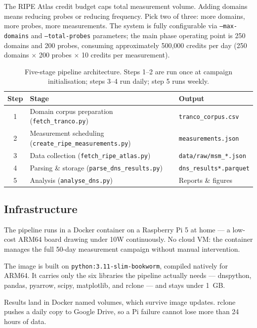 The RIPE Atlas credit budget caps total measurement volume. Adding domains means reducing probes or reducing frequency. Pick two of three: more domains, more probes, more measurements. The system is fully configurable via \texttt{--max-domains} and \texttt{--total-probes} parameters; the main phase operating point is 250 domains and 200 probes, consuming approximately 500,000 credits per day (250 domains $\times$ 200 probes $\times$ 10 credits per measurement).

\begin{table}[H]
\centering
\small
\begin{tabular}{c l l}
\toprule
\textbf{Step} & \textbf{Stage} & \textbf{Output} \\
\midrule
1 & Domain corpus preparation (\texttt{fetch\_tranco.py})         & \texttt{tranco\_corpus.csv} \\
2 & Measurement scheduling (\texttt{create\_ripe\_measurements.py}) & \texttt{measurements.json} \\
3 & Data collection (\texttt{fetch\_ripe\_atlas.py})               & \texttt{data/raw/msm\_*.json} \\
4 & Parsing \& storage (\texttt{parse\_dns\_results.py})           & \texttt{dns\_results*.parquet} \\
5 & Analysis (\texttt{analyse\_dns.py})                            & Reports \& figures \\
\bottomrule
\end{tabular}
\caption{Five-stage pipeline architecture. Steps 1--2 are run once at campaign initialisation; steps 3--4 run daily; step 5 runs weekly.}
\label{tab:pipeline_stages}
\end{table}

\subsection{Infrastructure}
\label{subsec:3.1.3}

The pipeline runs in a Docker container on a Raspberry Pi 5 at home --- a low-cost ARM64 board drawing under 10W continuously. No cloud VM: the container manages the full 50-day measurement campaign without manual intervention.

The image is built on \texttt{python:3.11-slim-bookworm}, compiled natively for ARM64. It carries only the six libraries the pipeline actually needs --- dnspython, pandas, pyarrow, scipy, matplotlib, and rclone --- and stays under 1~GB.

Results land in Docker named volumes, which survive image updates. rclone pushes a daily copy to Google Drive, so a Pi failure cannot lose more than 24 hours of data.

